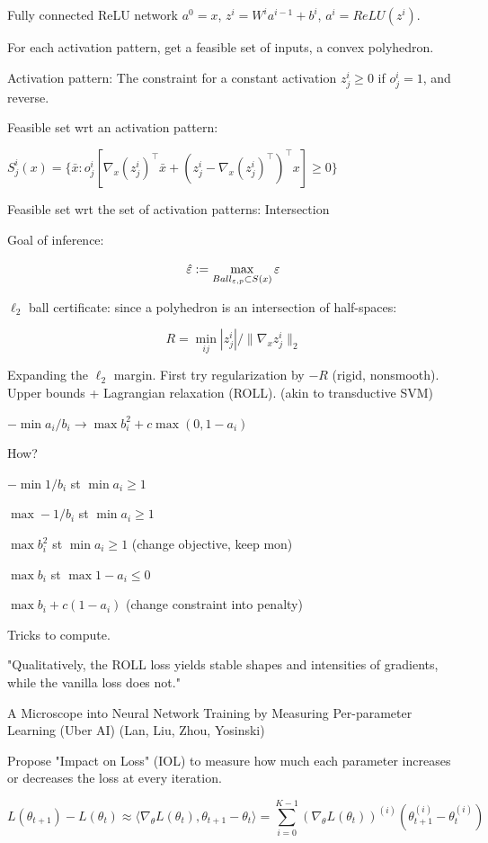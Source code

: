 \documentclass[english]{article}
\begin{document}
Fully connected ReLU network $a^0=x$, $z^i = W^i a^{i-1}+b^i$, $a^i = ReLU(z^i)$.

For each activation pattern, get a feasible set of inputs, a convex polyhedron. 

Activation pattern: The constraint for a constant activation $z^i_j \ge 0$ if $o^i_j=1$, and reverse. 

Feasible set wrt an activation pattern: 

$S^i_j(x) = \{ \bar x: o^i_j 
[\nabla_x (z^i_j)^\top \bar x  
+ (z^i_j - \nabla_x (z^i_j)^\top)^\top x] \ge 0\}$

Feasible set wrt the set of activation patterns: Intersection 

Goal of inference:

$$\hat {\varepsilon} := \max_{Ball_{\varepsilon,p}\subset S(x)}\varepsilon$$

$\ell_2$ ball certificate: since a polyhedron is an intersection of half-spaces: 

$$R = \min_{ij} |z^i_j|/\|\nabla_x z^i_j\|_2$$

Expanding the $\ell_2$ margin. First try regularization by $-R$ (rigid, nonsmooth). Upper bounds + Lagrangian relaxation (ROLL). (akin to transductive SVM)

$-\min{a_i/b_i} \to \max b_i^2 + c\max(0,1-a_i)$

How? 

$-\min 1/b_i$ st $\min a_i\ge 1$

$\max - 1/b_i$ st $\min a_i\ge 1$

$\max b_i^2$ st $\min  a_i\ge 1$ (change objective, keep mon)

$\max b_i$ st $\max 1-a_i \le 0$ 

$\max b_i + c(1-a_i)$ (change constraint into penalty)


Tricks to compute. 

"Qualitatively, the ROLL loss yields stable shapes
and intensities of gradients, while the vanilla loss does not."


\item A Microscope into Neural Network
Training by Measuring Per-parameter Learning (Uber AI) (Lan, Liu, Zhou, Yosinski)

Propose "Impact on
Loss" (IOL) to measure how much each
parameter increases or decreases the loss at
every iteration.

$$L(\theta_{t+1} ) - L(\theta_{t} ) \approx 
\langle\nabla_\theta L(\theta_{t} ), \theta_{t+1} - \theta_{t} 
\rangle
=
\sum_{i=0}^{K-1}
(\nabla_\theta L(\theta_{t} ))^{(i)} (\theta
^{(i)}_{t+1}
- \theta^{(i)}_t)
$$
\end{document}
